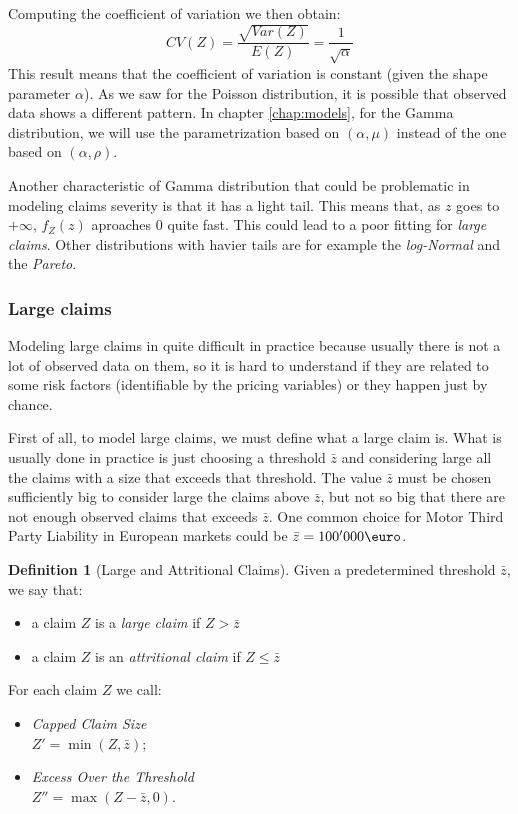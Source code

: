 \documentclass[a4paper, nobind]{templates/ociamthesis}
\theoremstyle{definition}
\newtheorem{definition}{Definition}[chapter]
\theoremstyle{definition}
\theoremstyle{definition}
\theoremstyle{remark}
\begin{document}
Computing the coefficient of variation we then obtain:
\[CV(Z) = \frac{\sqrt{Var(Z)}}{E(Z)} = \frac{1}{\sqrt{\alpha}}\]
This result means that the coefficient of variation is constant (given the shape parameter \(\alpha\)). As we saw for the Poisson distribution, it is possible that observed data shows a different pattern. In chapter \ref{chap:models}, for the Gamma distribution, we will use the parametrization based on \((\alpha, \mu)\) instead of the one based on \((\alpha, \rho)\).

Another characteristic of Gamma distribution that could be problematic in modeling claims severity is that it has a light tail. This means that, as \(z\) goes to \(+\infty\), \(f_Z(z)\) aproaches \(0\) quite fast. This could lead to a poor fitting for \emph{large claims}. Other distributions with havier tails are for example the \emph{log-Normal} and the \emph{Pareto}.

\hypertarget{chap:large-claims}{%
\subsubsection{Large claims}\label{chap:large-claims}}

Modeling large claims in quite difficult in practice because usually there is not a lot of observed data on them, so it is hard to understand if they are related to some risk factors (identifiable by the pricing variables) or they happen just by chance.

First of all, to model large claims, we must define what a large claim is. What is usually done in practice is just choosing a threshold \(\bar{z}\) and considering large all the claims with a size that exceeds that threshold. The value \(\bar{z}\) must be chosen sufficiently big to consider large the claims above \(\bar{z}\), but not so big that there are not enough observed claims that exceeds \(\bar{z}\). One common choice for Motor Third Party Liability in European markets could be \(\bar{z} = 100' 000 \text{\euro}\).

\begin{definition}[Large and Attritional Claims]
\label{def:def-large-claim} \iffalse (Large and Attritional Claims) \fi{} Given a predetermined threshold \(\bar{z}\), we say that:

\begin{itemize}
\item a claim $Z$ is a \textit{large claim} if $Z > \bar{z}$
\item a claim $Z$ is an \textit{attritional claim} if $Z \le \bar{z}$
\end{itemize}

For each claim \(Z\) we call:

\begin{itemize}
\item \textit{Capped Claim Size} \\
      $Z' = \min(Z, \bar{z})$;
\item \textit{Excess Over the Threshold} \\
      $Z'' = \max(Z - \bar{z}, 0)$.
\end{itemize}
\end{definition}
\end{document}
